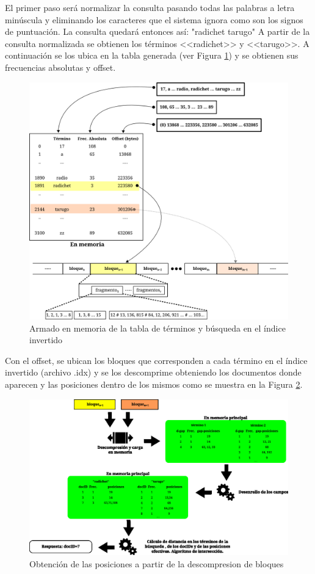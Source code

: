 El primer paso será normalizar la consulta pasando todas las palabras a letra minúscula y eliminando los caracteres que el sistema ignora como son los signos de puntuación. La consulta quedará entonces así: "radichet tarugo"
A partir de la consulta normalizada se obtienen los términos <<radichet>> y <<tarugo>>. 
A continuación se los ubica en la tabla generada (ver Figura \ref{fig:consulta1}) y se obtienen sus frecuencias absolutas y offset.


\begin{figure}[!h]
\centering
    \includegraphics[scale=0.8]{./Images/consulta1.png}
\caption{Armado en memoria de la tabla de términos y búsqueda en el índice invertido}
\label{fig:consulta1}
\end{figure}


Con el offset, se ubican los bloques que corresponden a cada término en el índice invertido (archivo .idx) y se los descomprime obteniendo los documentos donde aparecen y las posiciones dentro de los mismos como se muestra en la Figura \ref{fig:consulta2}.


\begin{figure}[!h]
\centering
    \includegraphics[scale=0.6]{./Images/consulta2.png}
\caption{Obtención de las posiciones a partir de la descompresion de bloques}
\label{fig:consulta2}
\end{figure}


